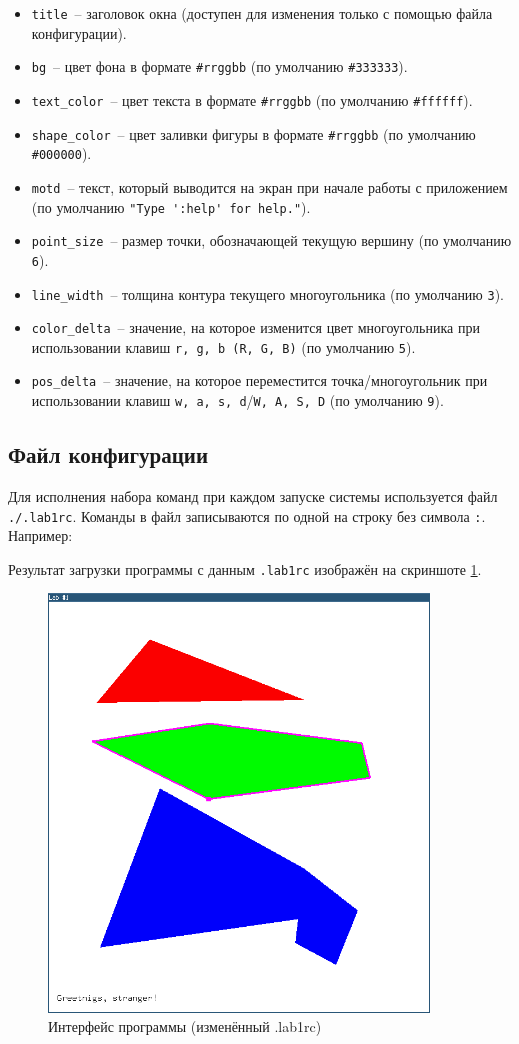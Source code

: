 \documentclass[oneside, final, 10pt]{extarticle}
\begin{document}
\begin{itemize}
	\item \verb~title~~-- заголовок окна (доступен для изменения только с помощью файла конфигурации).
	\item \verb~bg~~-- цвет фона в формате \verb~#rrggbb~ (по умолчанию \verb~#333333~).
	\item \verb~text_color~~-- цвет текста в формате \verb~#rrggbb~ (по умолчанию \verb~#ffffff~).
	\item \verb~shape_color~~-- цвет заливки фигуры в формате \verb~#rrggbb~ (по умолчанию \verb~#000000~).
	\item \verb~motd~~-- текст, который выводится на экран при начале работы с приложением (по умолчанию \verb~"Type ':help' for help."~).
	\item \verb~point_size~~-- размер точки, обозначающей текущую вершину (по умолчанию \verb~6~).
	\item \verb~line_width~~-- толщина контура текущего многоугольника (по умолчанию \verb~3~).
	\item \verb~color_delta~~-- значение, на которое изменится цвет многоугольника при использовании клавиш \verb~r, g, b (R, G, B)~ (по умолчанию \verb~5~).
	\item \verb~pos_delta~~-- значение, на которое переместится точка/многоугольник при использовании клавиш \verb~w, a, s, d~/\verb~W, A, S, D~ (по умолчанию \verb~9~).
\end{itemize}

\subsection{Файл конфигурации}

Для исполнения набора команд при каждом запуске системы используется файл \verb~./.lab1rc~. Команды в файл записываются по одной на строку без символа \verb~:~. Например:

\lstset{caption=.lab1rc}


Результат загрузки программы с данным \verb~.lab1rc~ изображён на скриншоте \ref{rcd}.

\begin{figure}[t]
	\centering
	\includegraphics[width=0.9\textwidth]{screen/rcd}
	\caption{Интерфейс программы (изменённый .lab1rc)}
	\label{rcd}
\end{figure}
\end{document}
